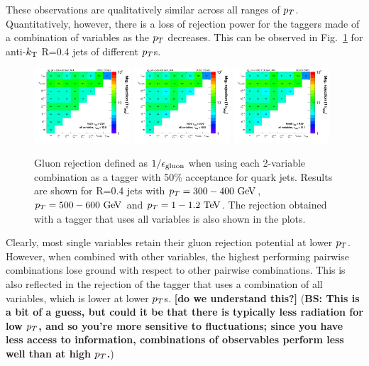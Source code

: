 These observations are qualitatively similar across all ranges of $p_T$. Quantitatively, however,
there is a loss of rejection power for the taggers made of a combination of variables as the $p_T$ decreases. 
This can be observed in Fig.~\ref{fig:qg_akt4_comb} for anti-$k_{\mathrm{T}}$ R=0.4 jets of different $p_T$s. 
\begin{figure}
\begin{center}
\includegraphics[width=0.32\textwidth]{./Figures/QGTagging/pT300/AKtR04/effBkg2D.png}
\includegraphics[width=0.32\textwidth]{./Figures/QGTagging/pT500/AKtR04/effBkg2D.png}
\includegraphics[width=0.32\textwidth]{./Figures/QGTagging/pT1000/AKtR04/effBkg2D.png}
\caption{Gluon rejection defined as $1/\epsilon_{\rm gluon}$ when using each 2-variable combination 
as a tagger with 50\% acceptance for quark jets. Results are shown for R=0.4 jets with $\pt=300-400 \GeV$, 
$\pt=500-600 \GeV$ and $\pt=1-1.2 \TeV$. The rejection obtained with a tagger that uses all variables is also shown
in the plots. }
\label{fig:qg_akt4_comb}
\end{center}
\end{figure}
Clearly, most single variables retain their gluon rejection potential at lower $p_T$. However, when combined
with other variables, the highest performing pairwise combinations lose ground with respect to other pairwise 
combinations. This is also reflected in the rejection of the tagger that uses a combination of all variables, which
is lower at lower $p_T$s. {\bf [do we understand this?]} ({\bf BS: This is a bit of a guess, but could it be that there is typically less radiation for low $p_T$, and so you're more sensitive to fluctuations; since you have less access to information, combinations of observables perform less well than at high $p_T$.})


